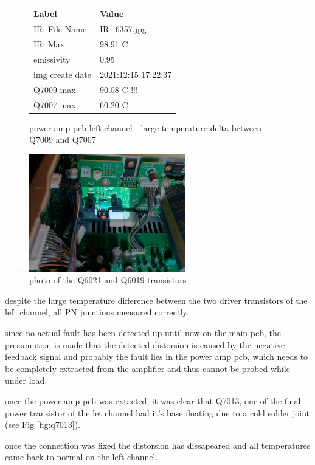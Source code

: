\documentclass[a4paper,twoside,notitlepage]{article}
\begin{document}
\begin{figure}[hptb!]
 \vspace*{5mm}
 \begin{tabular}{ l | l }
  Label & Value \\ \hline
  IR: File Name & IR\_6357.jpg \\
  IR: Max & 98.91 C \\
  emissivity & 0.95 \\
  img create date & 2021:12:15 17:22:37 \\
  Q7009 max & 90.08 C !!! \\
  Q7007 max & 60.20 C \\
 \end{tabular}

 \caption{power amp pcb left channel - large temperature delta between Q7009 and Q7007}
 \label{tab:pwr-pcb-l-ir}
\end{figure}

\begin{figure}[hptb!]
\centering
 \includegraphics[width=6.8cm, keepaspectratio=true]{img_report/power_amp_pcb_l}
 \caption{photo of the Q6021 and Q6019 transistors}
\end{figure}

despite the large temperature difference between the two driver transistors of the left channel, all PN junctions measured correctly.

since no actual fault has been detected up until now on the main pcb, the presumption is made that the detected distorsion is caused by the negative feedback signal and probably the fault lies in the power amp pcb, which needs to be completely extracted from the amplifier and thus cannot be probed while under load.

once the power amp pcb was extacted, it was clear that Q7013, one of the final power transistor of the let channel had it's base floating due to a cold solder joint (see Fig \ref{fig:q7013}).

once the connection was fixed the distorsion has dissapeared and all temperatures came back to normal on the left channel.
\end{document}
